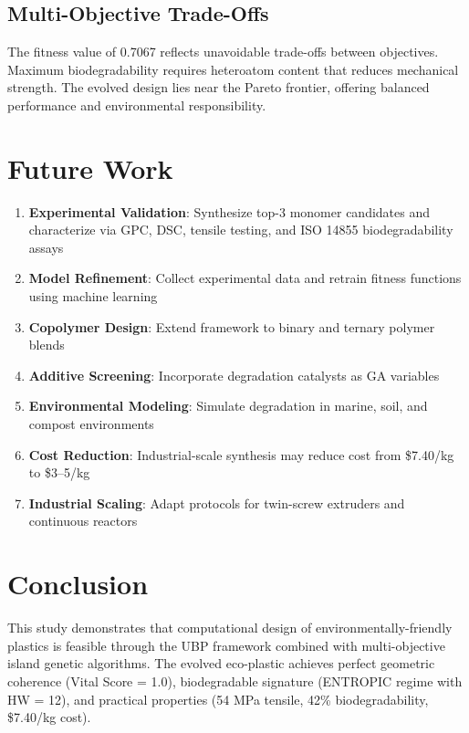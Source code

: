 \documentclass[11pt]{article}
\begin{document}
\subsection{Multi-Objective Trade-Offs}

The fitness value of 0.7067 reflects unavoidable trade-offs between objectives. Maximum biodegradability requires heteroatom content that reduces mechanical strength. The evolved design lies near the Pareto frontier, offering balanced performance and environmental responsibility.

\section{Future Work}

\begin{enumerate}
    \item \textbf{Experimental Validation}: Synthesize top-3 monomer candidates and characterize via GPC, DSC, tensile testing, and ISO 14855 biodegradability assays
    \item \textbf{Model Refinement}: Collect experimental data and retrain fitness functions using machine learning
    \item \textbf{Copolymer Design}: Extend framework to binary and ternary polymer blends
    \item \textbf{Additive Screening}: Incorporate degradation catalysts as GA variables
    \item \textbf{Environmental Modeling}: Simulate degradation in marine, soil, and compost environments
    \item \textbf{Cost Reduction}: Industrial-scale synthesis may reduce cost from \$7.40/kg to \$3--5/kg
    \item \textbf{Industrial Scaling}: Adapt protocols for twin-screw extruders and continuous reactors
\end{enumerate}

\section{Conclusion}

This study demonstrates that computational design of environmentally-friendly plastics is feasible through the UBP framework combined with multi-objective island genetic algorithms. The evolved eco-plastic achieves perfect geometric coherence (Vital Score = 1.0), biodegradable signature (ENTROPIC regime with HW = 12), and practical properties (54 MPa tensile, 42\% biodegradability, \$7.40/kg cost).
\end{document}
